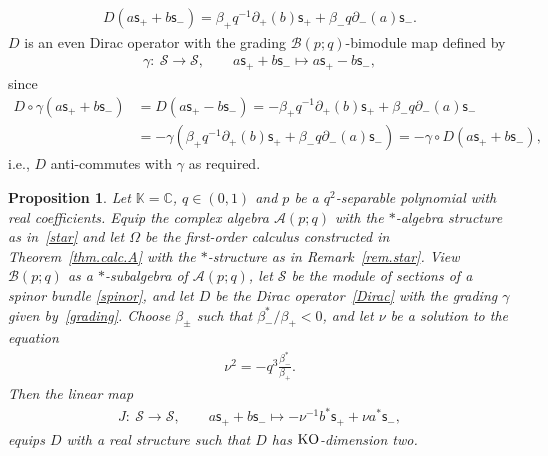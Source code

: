 \documentclass[pdftex]{sigma}
\numberwithin{equation}{section}
\newtheorem{Proposition}[Theorem]{Proposition}
{ \theoremstyle{definition}
\newtheorem{Definition}[Theorem]{Definition}
\newtheorem{Example}[Theorem]{Example}
\newtheorem{Remark}[Theorem]{Remark} }
\def\Weyl#1#2{{\mathcal{B}}(#1;#2)}
\def\AWeyl#1#2{{\mathcal{A}}(#1;#2)}
\begin{document}
\begin{gather}\label{Dirac}
D(a {\mathsf{s}}_+ + b {\mathsf{s}}_-) = \beta_+ q^{-1}\partial_+(b) {\mathsf{s}}_+ + \beta_- q \partial_-(a) {\mathsf{s}}_- .
\end{gather}
$D$ is an even Dirac operator with the grading $\Weyl p q$-bimodule map def\/ined by
\begin{gather}\label{grading}
\gamma\colon \ \mathcal{S} \to \mathcal{S}, \qquad a {\mathsf{s}}_+ + b {\mathsf{s}}_- \longmapsto a {\mathsf{s}}_+ - b {\mathsf{s}}_-,
\end{gather}
since
\begin{align*}
D\circ \gamma (a {\mathsf{s}}_++b {\mathsf{s}}_-) &= D(a {\mathsf{s}}_+-b {\mathsf{s}}_-) = -\beta_+ q^{-1}\partial_+(b) {\mathsf{s}}_+ + \beta_- q \partial_-(a) {\mathsf{s}}_-\\
& = -\gamma(\beta_+ q^{-1}\partial_+(b) {\mathsf{s}}_+ + \beta_- q \partial_-(a) {\mathsf{s}}_-) = - \gamma\circ D(a {\mathsf{s}}_++b {\mathsf{s}}_-),
\end{align*}
i.e., $D$ anti-commutes with $\gamma$ as required.

\begin{Proposition}\label{prop.real}
Let ${\mathbb K} = {\mathbb C}$, $q\in (0,1)$ and $p$ be a $q^2$-separable polynomial with real coefficients. Equip the complex algebra $\AWeyl p q$ with the $*$-algebra structure as in~\eqref{star} and let $\Omega$ be the first-order calculus constructed in Theorem~{\rm \ref{thm.calc.A}} with the $*$-structure as in Remark~{\rm \ref{rem.star}}. View $\Weyl p q$ as a $*$-subalgebra of $\AWeyl p q$, let $\mathcal{S}$ be the module of sections of a spinor bundle \eqref{spinor}, and let $D$ be the Dirac operator~\eqref{Dirac} with the grading $\gamma$ given by~\eqref{grading}. Choose $\beta_\pm$ such that $\beta_-^*/\beta_+<0$, and let $\nu$ be a solution to
the equation
\begin{gather}\label{constraint}
\nu^2 = -q^3\frac{\beta_-^*}{\beta_+}.
\end{gather}
Then the linear map
\begin{gather*}%
J \colon \ \mathcal{S} \to \mathcal{S}, \qquad a {\mathsf{s}}_++b {\mathsf{s}}_- \longmapsto -\nu^{-1} b^*{\mathsf{s}}_+ + \nu a^*{\mathsf{s}}_-,
\end{gather*}
equips $D$ with a real structure such that $D$ has ${\rm KO}$-dimension two.
\end{Proposition}
\end{document}
